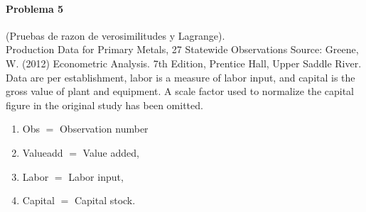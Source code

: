 \documentclass[12pt,a4paper]{report}
\begin{document}
\paragraph{Problema 5}  (Pruebas de razon de verosimilitudes y Lagrange).\\


\noindent Production Data for Primary Metals, 27 Statewide Observations Source: Greene, W. (2012) Econometric Analysis. 7th Edition, Prentice Hall, Upper Saddle River. Data are per establishment, labor is a measure of labor input, and capital is the gross value of plant and equipment. A scale factor used to normalize the capital figure in the original study has been omitted.

\begin{enumerate}
\item[$\bullet$] Obs $=$ Observation number \vspace{-10pt}
\item[$\bullet$] Valueadd $=$ Value added, \vspace{-10pt}
\item[$\bullet$] Labor $=$ Labor input, \vspace{-10pt}
\item[$\bullet$] Capital $=$ Capital stock.
\end{enumerate}
\end{document}
